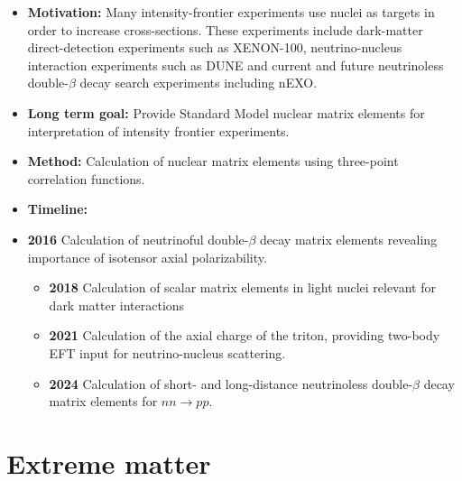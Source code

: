 \documentclass[12pt,hyperpdf]{article}
\begin{document}
\begin{itemize}  
    \item{\bf Motivation:} Many intensity-frontier experiments use nuclei as targets in order to increase cross-sections. These experiments include dark-matter direct-detection experiments such as XENON-100, neutrino-nucleus interaction experiments such as DUNE and current and future neutrinoless double-$\beta$ decay search experiments including nEXO.
    
    \item{\bf Long term goal:}  Provide Standard Model nuclear matrix elements for interpretation of intensity frontier experiments.
    
    \item{\bf Method:} 
    Calculation of nuclear matrix elements using three-point correlation functions.
    
\item{\bf Timeline:}
\item{\bf 2016} Calculation of neutrinoful double-$\beta$ decay matrix elements revealing importance of isotensor axial polarizability.
\begin{itemize}
    \item{\bf 2018} Calculation of scalar matrix elements in light nuclei relevant for dark matter interactions 
    \item{\bf 2021} Calculation of the axial charge of the triton, providing two-body EFT input for neutrino-nucleus scattering.
    \item{\bf 2024} Calculation of short- and long-distance neutrinoless double-$\beta$ decay matrix elements for $nn\to pp$.
\end{itemize}
\end{itemize}


\section{Extreme matter}\label{sec:extreme}

\end{document}
